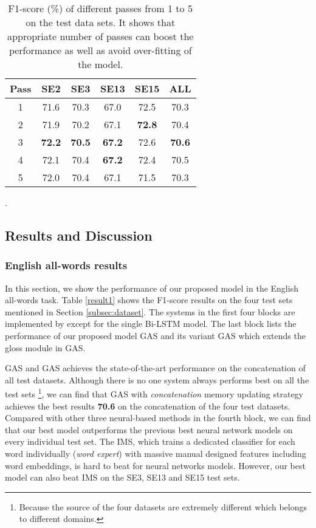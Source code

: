 \documentclass[11pt,a4paper]{article}
\begin{document}
\begin{table}[]
\centering
    \begin{tabular}{|c|c|c|c|c|c|
    }
      \hline
\bf Pass & \bf SE2 & \bf SE3 & \bf SE13 & \bf SE15 & \bf ALL \\ \hline
        1 & 71.6 & 70.3 & 67.0 & 72.5 & 70.3 \\ \hline
        2 & 71.9 & 70.2 & 67.1 & \bf 72.8 & 70.4 \\ \hline
        3 & \bf 72.2 & \bf 70.5 & \bf 67.2 & 72.6 & \bf 70.6 \\ \hline
        4 & 72.1 & 70.4 & \bf 67.2 & 72.4 & 70.5 \\ \hline
        5 & 72.0 & 70.4 & 67.1 & 71.5 & 70.3 \\ \hline
    \end{tabular}
   \caption{ F1-score (\%) of different passes from 1 to 5 on the test data sets.
It shows that appropriate number of passes can boost the performance as well as avoid over-fitting of the model.
   }\label{table:n-passes}.
   \vspace{-0.3in}
\end{table}

\subsection{Results and Discussion}
\subsubsection{English all-words results}
In this section, we show the performance of our proposed model in the English all-words task.
Table \ref{result1} shows the F1-score results on the four test sets mentioned in Section \ref{subsec:dataset}.
The systems in the first four blocks are implemented by \citet{Raganato2017,raganato2017wsdData} except for the single Bi-LSTM model. The last block lists the performance of our proposed model GAS and its variant GAS which extends the gloss module in GAS.

GAS and GAS achieves the state-of-the-art performance on the concatenation of all test datasets.
Although there is no one system always performs best on all the test sets \footnote{ Because the source of the four datasets are extremely different which belongs to different domains.}, we can find that GAS with {\em concatenation} memory updating strategy achieves the best results \textbf{70.6} on the concatenation of the four test datasets.
Compared with other three neural-based methods in the fourth block, we can find that our best model outperforms the previous best neural network models \cite{Raganato2017} on every individual test set.
The IMS, which trains a dedicated classifier for each word individually ({\em word expert}) with massive manual designed features including word embeddings, is hard to beat for neural networks models.
However, our best model can also beat IMS on the SE3, SE13 and SE15 test sets.
\end{document}
